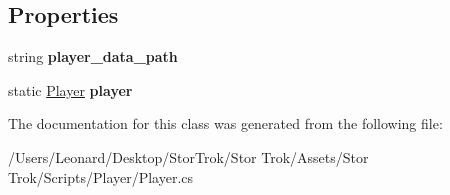 \subsection*{Properties}
\begin{DoxyCompactItemize}
\item 
\mbox{\label{class_player_ac7317ab15537dffd0222fc019fe28c5e}} 
string {\bfseries player\+\_\+data\+\_\+path}
\item 
\mbox{\label{class_player_a626d7b1a0a69ccb17979ea7a0728fca7}} 
static \hyperlink{class_player}{Player} {\bfseries player}
\end{DoxyCompactItemize}


The documentation for this class was generated from the following file\+:\begin{DoxyCompactItemize}
\item 
/\+Users/\+Leonard/\+Desktop/\+Stor\+Trok/\+Stor Trok/\+Assets/\+Stor Trok/\+Scripts/\+Player/Player.\+cs\end{DoxyCompactItemize}

